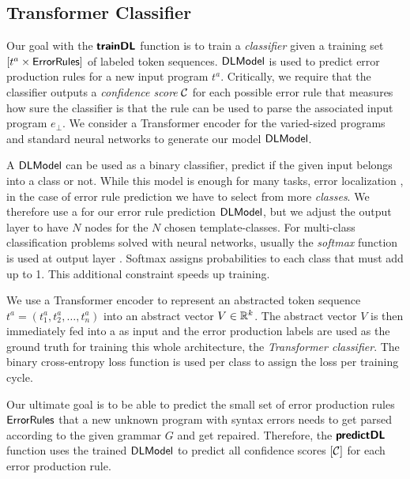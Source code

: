 \subsection{Transformer Classifier}
\label{sec:seq-classifiers:location-rank}

Our goal with the $\bm{\mathsf{trainDL}}$ function is to train a \emph{classifier} given a
training set $[t^a \times \mathsf{ErrorRules}]$ of labeled token sequences.
$\mathsf{DLModel}$ is used to predict error production rules for a new input program
$t^a$. Critically, we require that the classifier outputs a \emph{confidence
score} $\mathcal{C}$ for each possible error rule that measures how sure the
classifier is that the rule can be used to parse the associated input program
$e_{\bot}$. We consider a Transformer encoder for the varied-sized programs and
standard neural networks to generate our model $\mathsf{DLModel}$.

%
A \dnn $\mathsf{DLModel}$ can be used as a binary classifier, \ie predict if the given
input belongs into a class or not. While this model is enough for many tasks,
\eg error localization \citep{Sakkas_2020}, in the case of error rule prediction
we have to select from more \emph{classes}. We therefore use a \dnn for our
error rule prediction $\mathsf{DLModel}$, but we adjust the output layer to have $N$ nodes
for the $N$ chosen template-classes. For multi-class classification problems
solved with neural networks, usually the \emph{softmax} function is used at
output layer \citep{Goodfellow-et-al-2016, Bishop-book-2006}. Softmax assigns
probabilities to each class that must add up to 1. This additional constraint
speeds up training.

%
We use a Transformer encoder to represent an abstracted token sequence $t^a =
(t^a_1, t^a_2, \dots, t^a_n)$ into an abstract vector $V \in \mathbb{R}^k$. The abstract
vector $V$ is then immediately fed into a \dnn as input and the error production
labels are used as the ground truth for training this whole architecture, \ie
the \emph{Transformer classifier}. The binary cross-entropy loss function is
used per class to assign the loss per training cycle.

%
Our ultimate goal is to be able to predict the small set of error production
rules $\mathsf{ErrorRules}$ that a new unknown program with syntax errors needs to
get parsed according to the given grammar $G$ and get repaired. Therefore, the
$\bm{\mathsf{predictDL}}$ function uses the trained $\mathsf{DLModel}$ to predict all confidence
scores $[\mathcal{C}]$ for each error production rule.

